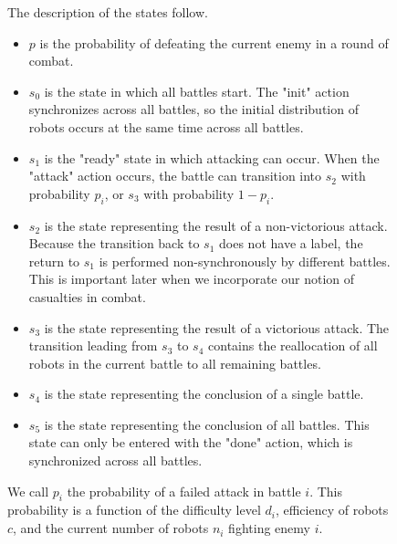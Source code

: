 \documentclass[11pt]{article}
\theoremstyle{definition}
\begin{document}
\begin{description}
\begin{figure}[ht]
    The description of the states follow.

    \begin{itemize}
        \item $p$ is the probability of defeating the current
            enemy in a round of combat.
        \item $s_0$ is the state in which all battles start.
            The "init" action synchronizes across all
            battles, so the initial
            distribution of robots occurs at the same time
            across all battles.
        \item $s_1$ is the "ready" state in which
            attacking can occur. When the "attack" action
            occurs, the battle can transition into
            $s_2$ with probability $p_i$, or
            $s_3$ with probability $1 - p_i$.
        \item $ s_2 $ is the state representing the result
            of a non-victorious attack. Because
            the transition back to $s_1$ does not
            have a label, the return to $s_1$ is
            performed non-synchronously by different battles.
            This is important later when we incorporate
            our notion of casualties in combat.
        \item $s_3$ is the state representing the result
            of a victorious attack. The transition
            leading from $s_3$ to $s_4$ contains
            the reallocation of all robots in the
            current battle to all remaining battles.
        \item $s_4$ is the state representing the
            conclusion of a single battle.
        \item $s_5$ is the state representing the
            conclusion of all battles. This state
            can only be entered with the "done" action,
            which is synchronized across all battles.
    \end{itemize}

    We call $p_i$ the probability of a failed
    attack in battle $i$. This probability
    is a function of the difficulty level $ d_i $,
    efficiency of robots $c$, and
    the current number of robots $n_i$ fighting
    enemy $i$.
\end{figure}


\end{description}
\end{document}
